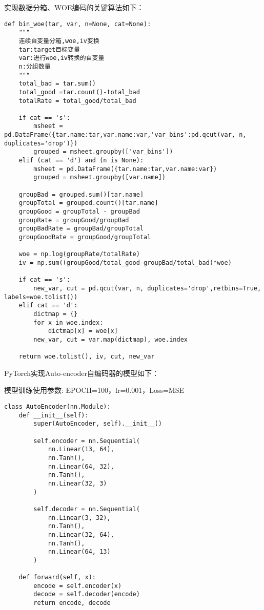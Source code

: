 实现数据分箱、WOE编码的关键算法如下：
\begin{lstlisting}[frame=shadowbox]
    def bin_woe(tar, var, n=None, cat=None):
    """
    连续自变量分箱,woe,iv变换
    tar:target目标变量
    var:进行woe,iv转换的自变量
    n:分组数量
    """
    total_bad = tar.sum()
    total_good =tar.count()-total_bad
    totalRate = total_good/total_bad
    
    if cat == 's':
        msheet = pd.DataFrame({tar.name:tar,var.name:var,'var_bins':pd.qcut(var, n, duplicates='drop')})
        grouped = msheet.groupby(['var_bins'])
    elif (cat == 'd') and (n is None):
        msheet = pd.DataFrame({tar.name:tar,var.name:var})
        grouped = msheet.groupby([var.name])
        
    groupBad = grouped.sum()[tar.name]
    groupTotal = grouped.count()[tar.name]
    groupGood = groupTotal - groupBad
    groupRate = groupGood/groupBad
    groupBadRate = groupBad/groupTotal
    groupGoodRate = groupGood/groupTotal

    woe = np.log(groupRate/totalRate)
    iv = np.sum((groupGood/total_good-groupBad/total_bad)*woe)
    
    if cat == 's':
        new_var, cut = pd.qcut(var, n, duplicates='drop',retbins=True, labels=woe.tolist())
    elif cat == 'd':
        dictmap = {}
        for x in woe.index:
            dictmap[x] = woe[x]
        new_var, cut = var.map(dictmap), woe.index

    return woe.tolist(), iv, cut, new_var
\end{lstlisting}

PyTorch实现Auto-encoder自编码器的模型如下：

模型训练使用参数: EPOCH=100，lr=0.001，Loss=MSE
\begin{lstlisting}[frame=shadowbox]
    class AutoEncoder(nn.Module):
    def __init__(self):
        super(AutoEncoder, self).__init__()
        
        self.encoder = nn.Sequential(
            nn.Linear(13, 64),
            nn.Tanh(),
            nn.Linear(64, 32),
            nn.Tanh(),
            nn.Linear(32, 3)
        )
        
        self.decoder = nn.Sequential(
            nn.Linear(3, 32),
            nn.Tanh(),
            nn.Linear(32, 64),
            nn.Tanh(),
            nn.Linear(64, 13)
        )
        
    def forward(self, x):
        encode = self.encoder(x)
        decode = self.decoder(encode)
        return encode, decode
\end{lstlisting}



